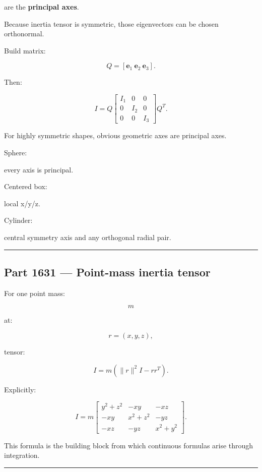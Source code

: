 are the \textbf{principal axes}.

Because inertia tensor is symmetric, those eigenvectors can be chosen orthonormal.

Build matrix:

\[
Q=
[
\mathbf{e}_1\
\mathbf{e}_2\
\mathbf{e}_3
].
\]

Then:

\[
\boxed{
I
=
Q
\begin{bmatrix}
I_1&0&0\\
0&I_2&0\\
0&0&I_3
\end{bmatrix}
Q^T.
}
\]

For highly symmetric shapes, obvious geometric axes are principal axes.

Sphere:

every axis is principal.

Centered box:

local x/y/z.

Cylinder:

central symmetry axis and any orthogonal radial pair.

\begin{center}\rule{0.5\linewidth}{0.5pt}\end{center}

\subsection{Part 1631 --- Point-mass inertia tensor}\label{06-engine-ii-ch035-part-1631-point-mass-inertia-tensor}

For one point mass:

\[
m
\]

at:

\[
r=(x,y,z),
\]

tensor:

\[
\boxed{
I
=
m
(
\|r\|^2I-r r^T
).
}
\]

Explicitly:

\[
I
=
m
\begin{bmatrix}
y^2+z^2&-xy&-xz\\
-xy&x^2+z^2&-yz\\
-xz&-yz&x^2+y^2
\end{bmatrix}.
\]

This formula is the building block from which continuous formulas arise through integration.

\begin{center}\rule{0.5\linewidth}{0.5pt}\end{center}

